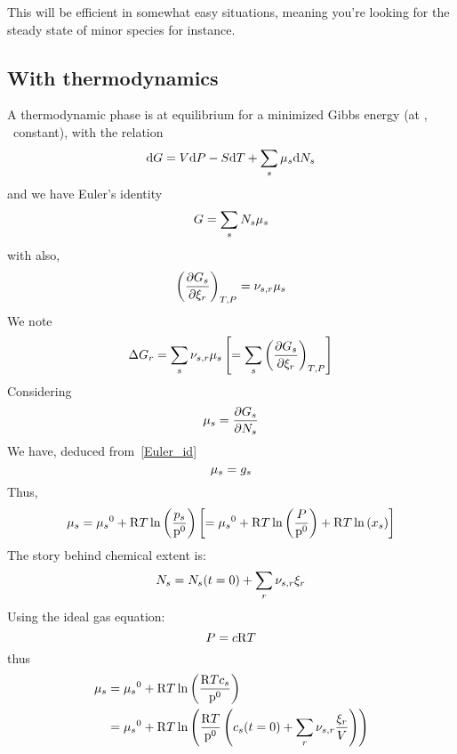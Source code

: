This will be efficient in somewhat easy situations, meaning you're looking for the
steady state of minor species for instance.

\subsection{With thermodynamics}
A thermodynamic phase is at equilibrium for a minimized Gibbs energy (at \Temp, \Press\ constant), with
the relation
\begin{equation}
\dd\Gibbs = \Vol\dd\Press - \Entr\dd\Temp + \sum_s\chempot[s]\dd\Mol[s]
\end{equation}
and we have Euler's identity
\begin{equation}
\Gibbs = \sum_s \Mol[s]\chempot[s]
\label{Euler_id}
\end{equation}
with also,
\begin{equation}
\left(\doverdext[r]{\Gibbs[s]}\right)_{\Temp,\Press} = \scoef[s,r]\chempot[s]
\end{equation}
We note
\begin{equation}
\DGibbs_r = \sum_s \scoef[s,r]\chempot[s] \left[= \sum_s \left(\doverdext[r]{\Gibbs[s]}\right)_{\Temp,\Press}\right]
\end{equation}
Considering
\begin{equation}
\chempot_s = \doverdn[s]{\Gibbs[s]}
\end{equation}
We have, deduced from~\ref{Euler_id}
\begin{equation}
\chempot[s] = \gibbs[s]
\end{equation}
Thus,
\begin{equation}
\chempot[s] = \chempotZ[s] + \Rg\Temp\ln\left(\frac{\press[s]}{\pz}\right)
     \left[ = \chempotZ[s] + \Rg\Temp\ln\left(\frac{\Press}{\pz}\right) + \Rg\Temp\ln\left(\molarfrac[s]\right) \right]
\end{equation}
The story behind chemical extent is:
\begin{equation}
\Mol[s] = \Mol[s](t=0) + \sum_r \scoef[s,r] \ext[r]
\end{equation}
Using the ideal gas equation:
\begin{equation}
\Press = \conc \Rg \Temp
\end{equation}
thus
\begin{equation}
\begin{split}
\chempot[s] & = \chempotZ[s] + \Rg\Temp\ln\left(\frac{\Rg \Temp \molar[s]}{\pz}\right) \\
            & = \chempotZ[s] + \Rg\Temp\ln\left(\frac{\Rg \Temp}{\pz}\left(\molar[s](t=0) + \sum_r \scoef[s,r]\frac{\ext[r]}{\Vol}\right)\right) \\
\end{split}
\end{equation}
